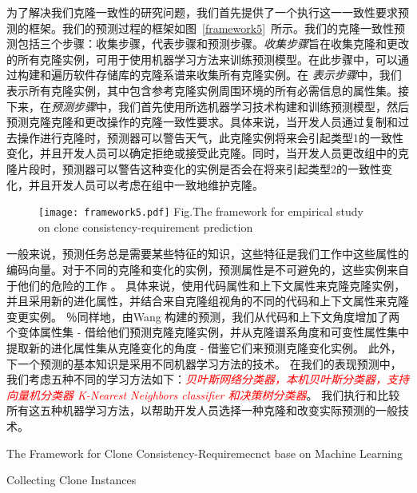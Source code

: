 为了解决我们克隆一致性的研究问题，我们首先提供了一个执行这一一致性要求预测的框架。我们的预测过程的框架如图~\ref{framework5}~所示。我们的克隆一致性预测包括三个步骤：收集步骤，代表步骤和预测步骤。{\em 收集步骤\/}旨在收集克隆和更改的所有克隆实例，可用于使用机器学习方法来训练预测模型。在此步骤中，可以通过构建和遍历软件存储库的克隆系谱来收集所有克隆实例。在\emph{ 表示步骤\/}中，我们表示所有克隆实例，其中包含参考克隆实例周围环境的所有必需信息的属性集。接下来，在{\em 预测步骤\/}中，我们首先使用所选机器学习技术构建和训练预测模型，然后预测克隆克隆和更改操作的克隆一致性要求。具体来说，当开发人员通过复制和过去操作进行克隆时，预测器可以警告天气，此克隆实例将来会引起类型1的一致性变化，并且开发人员可以确定拒绝或接受此克隆。同时，当开发人员更改组中的克隆片段时，预测器可以警告这种变化的实例是否会在将来引起类型2的一致性变化，并且开发人员可以考虑在组中一致地维护克隆。

\begin{figure}[htbp]
\centering
\texttt{[image: framework5.pdf]}
{Fig.$\!$}{The framework for empirical study on clone consistency-requirement prediction }
\vspace{-1em}
\end{figure}

一般来说，预测任务总是需要某些特征的知识，这些特征是我们工作中这些属性的编码向量。对于不同的克隆和变化的实例，预测属性是不可避免的，这些实例来自于他们的危险的工作\cite{wang2014predicting} \cite{zhang2016predicting}。
具体来说，使用代码属性和上下文属性来克隆克隆实例，并且采用新的进化属性，并结合来自克隆组视角的不同的代码和上下文属性来克隆变更实例。
％同样地，由Wang 构建的预测，我们从代码和上下文角度增加了两个变体属性集 - 借给他们预测克隆克隆实例，并从克隆谱系角度和可变性属性集中提取新的进化属性集从克隆变化的角度 - 借鉴它们来预测克隆变化实例。
此外，下一个预测的基本知识是采用不同机器学习方法的技术。
在我们的表现预测中，我们考虑五种不同的学习方法如下：\textcolor{red}{\em 贝叶斯网络分类器\cite{friedman1997bayesian}，本机贝叶斯分类器\cite{john1995estimating}，支持向量机分类器\cite{platt199912} K-Nearest Neighbors classifier \cite{aha1991instance}和决策树分类器\cite{quinlan2014c4}}。
我们执行和比较所有这五种机器学习方法，以帮助开发人员选择一种克隆和改变实际预测的一般技术。

{The Framework for Clone Consistency-Requiremecnct base on Machine Learning}

{Collecting Clone Instances}


